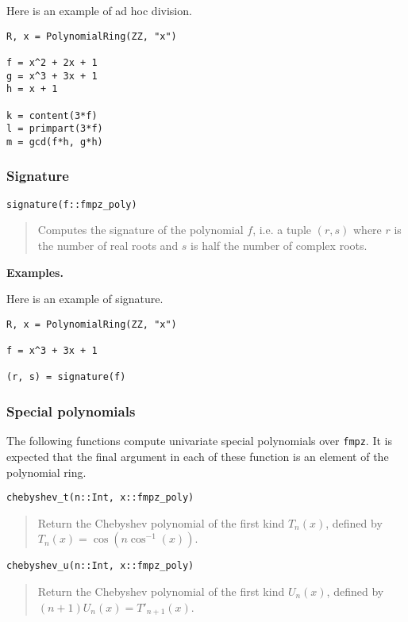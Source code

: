 \documentclass[a4paper,10pt]{article}
\newcommand{\code}{\lstinline}
\newcommand{\desc}[1]{\vspace{-3mm}\begin{quote}#1\end{quote}}
\begin{document}
{{Here is an example of ad hoc division.

\begin{lstlisting}
R, x = PolynomialRing(ZZ, "x")

f = x^2 + 2x + 1
g = x^3 + 3x + 1
h = x + 1

k = content(3*f)
l = primpart(3*f)
m = gcd(f*h, g*h)
\end{lstlisting}

\subsubsection{Signature}

\begin{lstlisting}
signature(f::fmpz_poly)
\end{lstlisting}

\desc{Computes the signature of the polynomial $f$, i.e. a tuple $(r, s)$ where $r$ is
the number of real roots and $s$ is half the number of complex roots.}

\textbf{Examples.}

Here is an example of signature.

\begin{lstlisting}
R, x = PolynomialRing(ZZ, "x")

f = x^3 + 3x + 1

(r, s) = signature(f)
\end{lstlisting}

\subsubsection{Special polynomials}

The following functions compute univariate special polynomials over \code{fmpz}. It is expected
that the final argument in each of these function is an element of the polynomial ring.

\begin{lstlisting}
chebyshev_t(n::Int, x::fmpz_poly)
\end{lstlisting}

\desc{Return the Chebyshev polynomial of the first kind $T_n(x)$, defined by 
$T_n(x) = \cos(n \cos^{-1}(x))$.}

\begin{lstlisting}
chebyshev_u(n::Int, x::fmpz_poly)
\end{lstlisting}

\desc{Return the Chebyshev polynomial of the first kind $U_n(x)$, defined by 
$(n+1) U_n(x) = T'_{n+1}(x)$.}

}}
\end{document}
